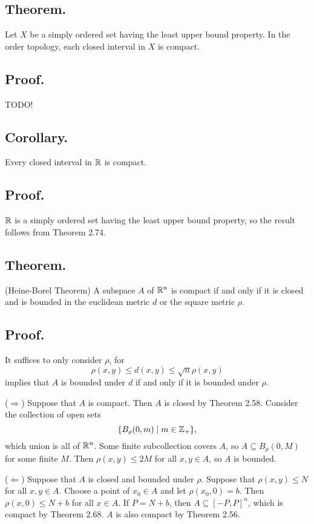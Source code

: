 \documentclass[titlepage]{article}
\begin{document}
\subsection{Theorem.} Let $X$ be a simply ordered set having the least upper bound property. In the order topology, each closed interval in $X$ is compact.

\subsection{Proof.} TODO!

\subsection{Corollary.} Every closed interval in $\mathbb{R}$ is compact.

\subsection{Proof.} $\mathbb{R}$ is a simply ordered set having the least upper bound property, so the result follows from Theorem 2.74.

\subsection{Theorem.} (Heine-Borel Theorem) A subspace $A$ of $\mathbb{R}^{n}$ is compact if and only if it is closed and is bounded in the euclidean metric $d$ or the square metric $\rho$.

\subsection{Proof.} It suffices to only consider $\rho$, for 
$$\rho(x, y) \leq d(x, y) \leq \sqrt{n} \rho(x, y)$$
implies that $A$ is bounded under $d$ if and only if it is bounded under $\rho$.

($\Rightarrow$) Suppose that $A$ is compact. Then $A$ is closed by Theorem 2.58. Consider the collection of open sets 
$$\{B_{\rho}(0, m) \mid m \in \mathbb{Z}_{+}\},$$
which union is all of $\mathbb{R}^{n}$. Some finite subcollection covers $A$, so $A \subseteq B_{\rho}(0, M)$ for some finite $M$. Then $\rho(x, y) \leq 2M$ for all $x, y \in A$, so $A$ is bounded.

($\Leftarrow$) Suppose that $A$ is closed and bounded under $\rho$. Suppose that $\rho(x, y) \leq N$ for all $x, y \in A$. Choose a point of $x_{0} \in A$ and let $\rho(x_{0}, 0) = b$. Then $\rho(x, 0) \leq N + b$ for all $x \in A$. If $P = N + b$, then $A \subseteq [-P, P]^{n}$, which is compact by Theorem 2.68. $A$ is also compact by Theorem 2.56.
\end{document}
